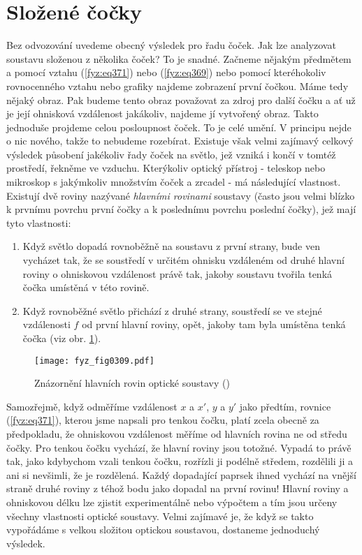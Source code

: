   \section{Složené čočky}\label{fyz:IchapXXVIIsecV}
    Bez odvozování uvedeme obecný výsledek pro řadu čoček. Jak lze analyzovat soustavu složenou z 
    několika čoček? To je snadné. Začneme nějakým předmětem a pomocí vztahu (\ref{fyz:eq371}) nebo 
    (\ref{fyz:eq369}) nebo pomocí kteréhokoliv rovnocenného vztahu nebo grafiky najdeme zobrazení 
    první čočkou. Máme tedy nějaký obraz. Pak budeme tento obraz považovat za zdroj pro další čočku 
    a ať už je její ohnisková vzdálenost jakákoliv, najdeme jí vytvořený obraz. Takto jednoduše 
    projdeme celou posloupnost čoček. To je celé umění. V principu nejde o nic nového, takže to 
    nebudeme rozebírat. Existuje však velmi zajímavý celkový výsledek působení jakékoliv řady čoček 
    na světlo, jež vzniká i končí v tomtéž prostředí, řekněme ve vzduchu. Kterýkoliv optický 
    přístroj - teleskop nebo mikroskop s jakýmkoliv množstvím čoček a zrcadel - má následující 
    vlastnost. Existují dvě roviny nazývané \emph{hlavními rovinami} soustavy (často jsou velmi 
    blízko k prvnímu povrchu první čočky a k poslednímu povrchu poslední čočky), jež mají tyto 
    vlastnosti: 
    \begin{enumerate}[noitemsep]
      \item Když světlo dopadá rovnoběžně na soustavu z první strany, bude ven vycházet tak, že 
             se soustředí v určitém ohnisku vzdáleném od druhé hlavní roviny o ohniskovou 
             vzdálenost právě tak, jakoby soustavu tvořila tenká čočka umístěná v této rovině.
      \item Když rovnoběžné světlo přichází z druhé strany, soustředí se ve stejné vzdálenosti 
            \(f\) od první hlavní roviny, opět, jakoby tam byla umístěna tenká čočka (viz obr. 
            \ref{fyz:fig0309}). 
    \end{enumerate}
    
    \begin{figure}[ht!] %
      \centering
      \texttt{[image: fyz\_fig0309.pdf]}
      \caption{Znázornění hlavních rovin optické soustavy
               (\cite[s.~355]{Feynman01})}
      \label{fyz:fig0309}
    \end{figure}
    
    Samozřejmě, když odměříme vzdálenost \(x\) a \(x'\), \(y\) a \(y'\) jako předtím, rovnice 
    (\ref{fyz:eq371}), kterou jsme napsali pro tenkou čočku, platí zcela obecně za předpokladu, že 
    ohniskovou vzdálenost měříme od hlavních rovina ne od středu čočky. Pro tenkou čočku vychází, 
    že hlavní roviny jsou totožné. Vypadá to právě tak, jako kdybychom vzali tenkou čočku, rozřízli 
    ji podélně středem, rozdělili ji a ani si nevšimli, že je rozdělená. Každý dopadající paprsek 
    ihned vychází na vnější straně druhé roviny z téhož bodu jako dopadal na první rovinu! Hlavní 
    roviny a ohniskovou délku lze zjistit experimentálně nebo výpočtem a tím jsou určeny všechny 
    vlastnosti optické soustavy. Velmi zajímavé je, že když se takto vypořádáme s velkou složitou 
    optickou soustavou, dostaneme jednoduchý výsledek.
    
